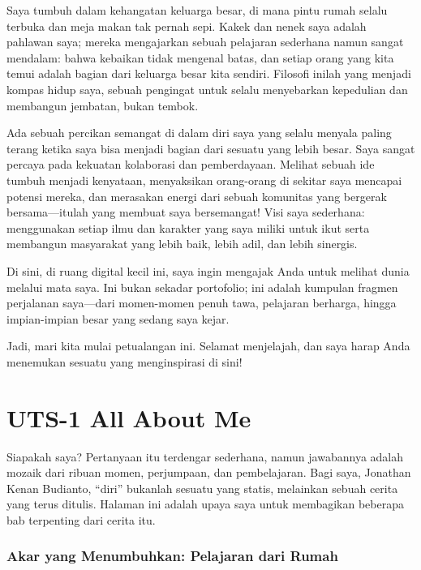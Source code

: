 \documentclass[
  letterpaper,
  DIV=11,
  numbers=noendperiod]{scrreprt}
\begin{document}
Saya tumbuh dalam kehangatan keluarga besar, di mana pintu rumah selalu
terbuka dan meja makan tak pernah sepi. Kakek dan nenek saya adalah
pahlawan saya; mereka mengajarkan sebuah pelajaran sederhana namun
sangat mendalam: bahwa kebaikan tidak mengenal batas, dan setiap orang
yang kita temui adalah bagian dari keluarga besar kita sendiri. Filosofi
inilah yang menjadi kompas hidup saya, sebuah pengingat untuk selalu
menyebarkan kepedulian dan membangun jembatan, bukan tembok.

Ada sebuah percikan semangat di dalam diri saya yang selalu menyala
paling terang ketika saya bisa menjadi bagian dari sesuatu yang lebih
besar. Saya sangat percaya pada kekuatan kolaborasi dan pemberdayaan.
Melihat sebuah ide tumbuh menjadi kenyataan, menyaksikan orang-orang di
sekitar saya mencapai potensi mereka, dan merasakan energi dari sebuah
komunitas yang bergerak bersama---itulah yang membuat saya bersemangat!
Visi saya sederhana: menggunakan setiap ilmu dan karakter yang saya
miliki untuk ikut serta membangun masyarakat yang lebih baik, lebih
adil, dan lebih sinergis.

Di sini, di ruang digital kecil ini, saya ingin mengajak Anda untuk
melihat dunia melalui mata saya. Ini bukan sekadar portofolio; ini
adalah kumpulan fragmen perjalanan saya---dari momen-momen penuh tawa,
pelajaran berharga, hingga impian-impian besar yang sedang saya kejar.

Jadi, mari kita mulai petualangan ini. Selamat menjelajah, dan saya
harap Anda menemukan sesuatu yang menginspirasi di sini!


\chapter{UTS-1 All About Me}\label{uts-1-all-about-me}

Siapakah saya? Pertanyaan itu terdengar sederhana, namun jawabannya
adalah mozaik dari ribuan momen, perjumpaan, dan pembelajaran. Bagi
saya, Jonathan Kenan Budianto, ``diri'' bukanlah sesuatu yang statis,
melainkan sebuah cerita yang terus ditulis. Halaman ini adalah upaya
saya untuk membagikan beberapa bab terpenting dari cerita itu.

\subsection{Akar yang Menumbuhkan: Pelajaran dari
Rumah}\label{akar-yang-menumbuhkan-pelajaran-dari-rumah}
\end{document}

